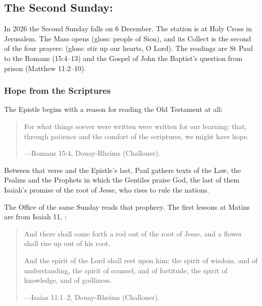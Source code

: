\subsection{The Second Sunday: }\label{sec:second-sunday}

In 2026 the Second Sunday falls on 6 December. The station is at Holy Cross in Jerusalem. The Mass opens
 (gloss: people of Sion), and its Collect is the second of the four
 prayers:  (gloss: stir up our hearts, O
Lord). The readings are St Paul to the Romans (15:4--13) and the Gospel of John the
Baptist's question from prison (Matthew 11:2--10).

\subsubsection{Hope from the Scriptures}

The Epistle begins with a reason for reading the Old Testament at all:

\begin{quote}
For what things soever were written were written for our learning: that, through patience and
the comfort of the scriptures, we might have hope.\par
{\smallskip\noindent\small ---Romans 15:4, Douay-Rheims (Challoner).\par}
\end{quote}

\noindent Between that verse and the Epistle's last, Paul gathers texts of the Law, the Psalms
and the Prophets in which the Gentiles praise God, the last of them Isaiah's promise of the root
of Jesse, who rises to rule the nations.

The Office of the same Sunday reads that prophecy. The first lessons at Matins are from Isaiah
11, :

\begin{quote}
And there shall come forth a rod out of the root of Jesse, and a flower shall rise up out of his
root.

And the spirit of the Lord shall rest upon him: the spirit of wisdom, and of understanding, the
spirit of counsel, and of fortitude, the spirit of knowledge, and of godliness.\par
{\smallskip\noindent\small ---Isaias 11:1--2, Douay-Rheims (Challoner).\par}
\end{quote}

